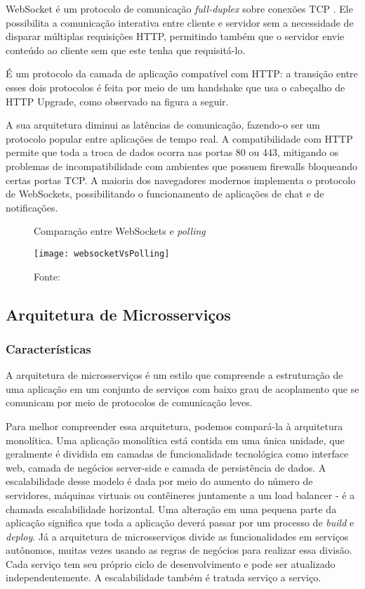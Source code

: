 WebSocket é um protocolo de comunicação \emph{full-duplex} sobre conexões TCP \cite{rfc6455}. Ele possibilita a comunicação interativa entre cliente e servidor sem a necessidade de disparar múltiplas requisições HTTP, permitindo também que o servidor envie conteúdo ao cliente sem que este tenha que requisitá-lo.

É um protocolo da camada de aplicação compatível com HTTP: a transição entre esses dois protocolos é feita por meio de um handshake que usa o cabeçalho de HTTP Upgrade, como observado na figura a seguir.

A sua arquitetura diminui as latências de comunicação, fazendo-o ser um protocolo popular entre aplicações de tempo real. A compatibilidade com HTTP permite que toda a troca de dados ocorra nas portas 80 ou 443, mitigando os problemas de incompatibilidade com ambientes que possuem firewalls bloqueando certas portas TCP. A maioria dos navegadores modernos implementa o protocolo de WebSockets, possibilitando o funcionamento de aplicações de chat e de notificações.

\begin{figure}[H]
	\centering
	\caption{Comparação entre WebSockets e \emph{polling}}
  \texttt{[image: websocketVsPolling]}
	\caption*{Fonte: \cite{lubbers}}
\label{fig:websocketVsPolling}
\end{figure}

\subsection{Arquitetura de Microsserviços}

\subsubsection{Características}
A arquitetura de microsserviços é um estilo que compreende a estruturação de uma aplicação em um conjunto de serviços com baixo grau de acoplamento que se comunicam por meio de protocolos de comunicação leves.

Para melhor compreender essa arquitetura, podemos compará-la à arquitetura monolítica. Uma aplicação monolítica está contida em uma única unidade, que geralmente é dividida em camadas de funcionalidade tecnológica como interface web, camada de negócios server-side e camada de persistência de dados. A escalabilidade desse modelo é dada por meio do aumento do número de servidores, máquinas virtuais ou contêineres juntamente a um load balancer - é a chamada escalabilidade horizontal. Uma alteração em uma pequena parte da aplicação significa que toda a aplicação deverá passar por um processo de \textit{build} e \textit{deploy}. Já a arquitetura de microsserviços divide as funcionalidades em serviços autônomos, muitas vezes usando as regras de negócios para realizar essa divisão. Cada serviço tem seu próprio ciclo de desenvolvimento e pode ser atualizado independentemente. A escalabilidade também é tratada serviço a serviço.

